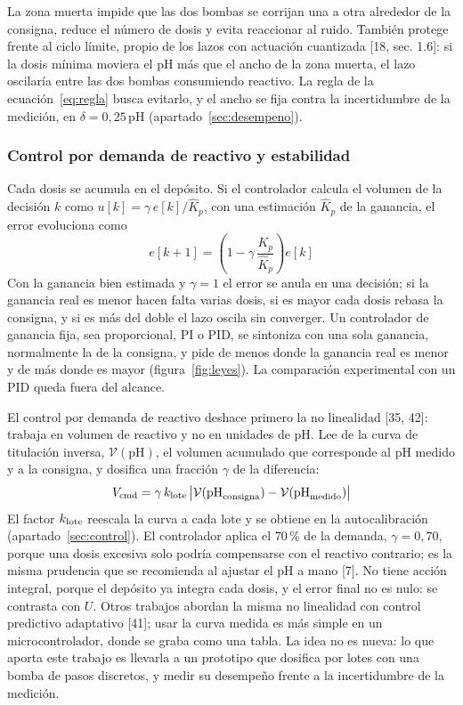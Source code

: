 
La zona muerta impide que las dos bombas se corrijan una a otra alrededor de la consigna, reduce el número de dosis y evita reaccionar al ruido. También protege frente al ciclo límite, propio de los lazos con actuación cuantizada [18, sec. 1.6]: si la dosis mínima moviera el pH más que el ancho de la zona muerta, el lazo oscilaría entre las dos bombas consumiendo reactivo. La regla de la ecuación~\eqref{eq:regla} busca evitarlo, y el ancho se fija contra la incertidumbre de la medición, en $\delta=0{,}25$\,pH (apartado~\ref{sec:desempeno}).

\subsubsection{Control por demanda de reactivo y estabilidad}\label{sec:demanda}
Cada dosis se acumula en el depósito. Si el controlador calcula el volumen de la decisión $k$ como $u[k]=\gamma\,e[k]/\hat K_p$, con una estimación $\hat K_p$ de la ganancia, el error evoluciona como
\begin{equation}
e[k+1]=\left(1-\gamma\,\frac{K_p}{\hat K_p}\right)e[k]\label{eq:lazo}
\end{equation}
Con la ganancia bien estimada y $\gamma=1$ el error se anula en una decisión; si la ganancia real es menor hacen falta varias dosis, si es mayor cada dosis rebasa la consigna, y si es más del doble el lazo oscila sin converger. Un controlador de ganancia fija, sea proporcional, PI o PID, se sintoniza con una sola ganancia, normalmente la de la consigna, y pide de menos donde la ganancia real es menor y de más donde es mayor (figura~\ref{fig:leyes}). La comparación experimental con un PID queda fuera del alcance.

El control por demanda de reactivo deshace primero la no linealidad [35, 42]: trabaja en volumen de reactivo y no en unidades de pH. Lee de la curva de titulación inversa, $\mathcal V(\mathrm{pH})$, el volumen acumulado que corresponde al pH medido y a la consigna, y dosifica una fracción $\gamma$ de la diferencia:
\begin{equation}
V_{\text{cmd}}=\gamma\,k_{\text{lote}}\,\bigl|\mathcal V(\mathrm{pH}_{\text{consigna}})-\mathcal V(\mathrm{pH}_{\text{medido}})\bigr|\label{eq:vcmd}
\end{equation}
El factor $k_{\text{lote}}$ reescala la curva a cada lote y se obtiene en la autocalibración (apartado~\ref{sec:control}). El controlador aplica el 70\,\% de la demanda, $\gamma=0{,}70$, porque una dosis excesiva solo podría compensarse con el reactivo contrario; es la misma prudencia que se recomienda al ajustar el pH a mano [7]. No tiene acción integral, porque el depósito ya integra cada dosis, y el error final no es nulo: se contrasta con $U$. Otros trabajos abordan la misma no linealidad con control predictivo adaptativo [41]; usar la curva medida es más simple en un microcontrolador, donde se graba como una tabla. La idea no es nueva: lo que aporta este trabajo es llevarla a un prototipo que dosifica por lotes con una bomba de pasos discretos, y medir su desempeño frente a la incertidumbre de la medición.

